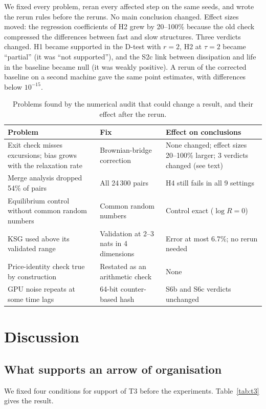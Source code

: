 \documentclass[11pt]{article}
\begin{document}
We fixed every problem, reran every affected step on the same seeds, and wrote
the rerun rules before the reruns. No main conclusion changed. Effect sizes moved: the regression coefficients of
H2 grew by 20--100\% because the old check compressed the differences between fast and slow structures. Three verdicts changed. H1 became supported in the D-test with $r=2$, H2 at $\tau=2$ became ``partial'' (it was ``not supported''),
and the S2c link between dissipation and life in the baseline became null (it was weakly positive). A rerun of the
corrected baseline on a second machine gave the same point estimates, with differences below $10^{-15}$.

\begin{table}[t]
\centering
\small
\caption{Problems found by the numerical audit that could change a result, and their effect after the rerun.}
\label{tab:audit}
\begin{tabular}{@{}p{5.6cm} p{3.4cm} p{4.4cm}@{}}
\toprule
Problem & Fix & Effect on conclusions \\
\midrule
Exit check misses excursions; bias grows with the relaxation rate & Brownian-bridge correction & None changed; effect sizes 20--100\% larger; 3 verdicts changed (see text) \\
Merge analysis dropped 54\% of pairs & All 24\,300 pairs & H4 still fails in all 9 settings \\
Equilibrium control without common random numbers & Common random numbers & Control exact ($\log R = 0$) \\
KSG used above its validated range & Validation at 2--3 nats in 4 dimensions & Error at most 6.7\%; no rerun needed \cite{Gao15} \\
Price-identity check true by construction & Restated as an arithmetic check & None \\
GPU noise repeats at some time lags & 64-bit counter-based hash & S6b and S6c verdicts unchanged \\
\bottomrule
\end{tabular}
\end{table}

\section{Discussion}

\subsection{What supports an arrow of organisation}
We fixed four conditions for support of T3 before the experiments. Table~\ref{tab:t3} gives the result.
\end{document}
